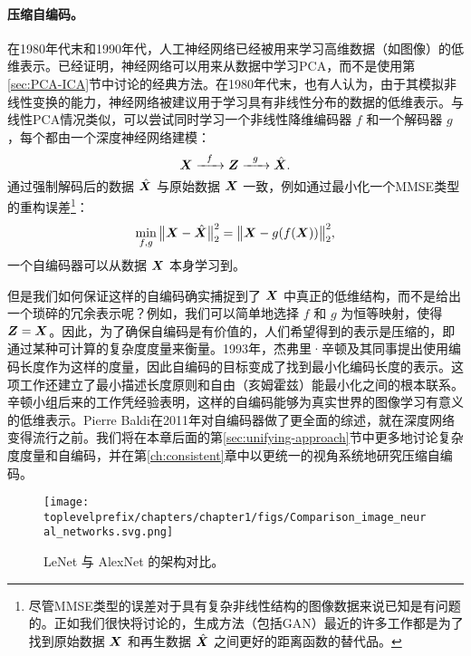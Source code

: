 \documentclass[../../book-main.tex]{subfiles}
\begin{document}
\paragraph{压缩自编码。}
在1980年代末和1990年代，人工神经网络已经被用来学习高维数据（如图像）的低维表示。已经证明，神经网络可以用来从数据中学习PCA\cite{Oja1982SimplifiedNM,Baldi89}，而不是使用第\ref{sec:PCA-ICA}节中讨论的经典方法。在1980年代末，也有人认为，由于其模拟非线性变换的能力，神经网络被建议用于学习具有非线性分布的数据的低维表示。与线性PCA情况类似，可以尝试同时学习一个非线性降维编码器 $f$ 和一个解码器 $g$，每个都由一个深度神经网络建模\cite{Rumelhart1986,Kramer1991NonlinearPC}：
\begin{equation}
    \bm{X}   \xrightarrow{\hspace{2mm} f \hspace{2mm}} \bm{Z}  \xrightarrow{\hspace{2mm} g \hspace{2mm}} \hat {\bm{X}}.
       \label{eqn:auto-encoding-deep-networks}
\end{equation}
通过强制解码后的数据 $\hat {\bm{X}}$ 与原始数据 $\bm{X}$ 一致，例如通过最小化一个MMSE类型的重构误差\footnote{尽管MMSE类型的误差对于具有复杂非线性结构的图像数据来说已知是有问题的。正如我们很快将讨论的，生成方法（包括GAN）最近的许多工作都是为了找到原始数据 $\bm{X}$ 和再生数据 $\hat {\bm{X}}$ 之间更好的距离函数的替代品。}：
\begin{equation}
    \min_{f,g} \big\|\bm{X} - \hat {\bm{X}}\big\|_2^2 = \big\|\bm{X} - g(f( \bm{X}))\big\|_2^2,
\end{equation}
一个自编码器可以从数据 $\bm{X}$ 本身学习到。

但是我们如何保证这样的自编码确实捕捉到了 $\bm{X}$ 中真正的低维结构，而不是给出一个琐碎的冗余表示呢？例如，我们可以简单地选择 $f$ 和 $g$ 为恒等映射，使得 $\bm{Z} = \bm{X}$。因此，为了确保自编码是有价值的，人们希望得到的表示是压缩的，即通过某种可计算的复杂度度量来衡量。1993年，杰弗里·辛顿及其同事提出使用编码长度作为这样的度量，因此自编码的目标变成了找到最小化编码长度的表示\cite{Hinton-1993}。这项工作还建立了最小描述长度原则\cite{Rissanen-1978}和自由（亥姆霍兹）能最小化之间的根本联系。辛顿小组后来的工作\cite{Hinton504}凭经验表明，这样的自编码能够为真实世界的图像学习有意义的低维表示。Pierre Baldi在2011年对自编码器做了更全面的综述\cite{Baldi2011}，就在深度网络变得流行之前。我们将在本章后面的第\ref{sec:unifying-approach}节中更多地讨论复杂度度量和自编码，并在第\ref{ch:consistent}章中以更统一的视角系统地研究压缩自编码。


\begin{figure}
    \centering
    \texttt{[image: \\toplevelprefix/chapters/chapter1/figs/Comparison\_image\_neural\_networks.svg.png]}
    \caption{LeNet \cite{LeCun-1989} 与 AlexNet \cite{krizhevsky2012imagenet} 的架构对比。}
    \label{fig:LeNet-AlexNet}
\end{figure}
\end{document}
